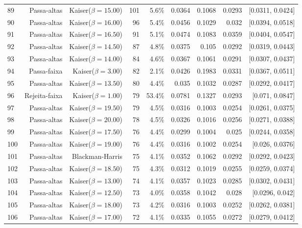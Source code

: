\begin{longtable}{lrrrrrrrr}
    89 & Passa-altas & Kaiser($\beta=15.00$) & 101 & 5.6\% & 0.0364 & 0.1068 & 0.0293 & [0.0311, 0.0424] \\
    90 & Passa-altas & Kaiser($\beta=16.00$) & 96 & 5.4\% & 0.0456 & 0.1029 & 0.032 & [0.0394, 0.0518] \\
    91 & Passa-altas & Kaiser($\beta=16.50$) & 91 & 5.1\% & 0.0474 & 0.1083 & 0.0359 & [0.0404, 0.0547] \\
    92 & Passa-altas & Kaiser($\beta=14.50$) & 87 & 4.8\% & 0.0375 & 0.105 & 0.0292 & [0.0319, 0.0443] \\
    93 & Passa-altas & Kaiser($\beta=14.00$) & 84 & 4.6\% & 0.0367 & 0.1061 & 0.0291 & [0.0307, 0.0437] \\
    94 & Passa-faixa & Kaiser($\beta=3.00$) & 82 & 2.1\% & 0.0426 & 0.1983 & 0.0331 & [0.0367, 0.0511] \\
    95 & Passa-altas & Kaiser($\beta=13.50$) & 80 & 4.4\% & 0.035 & 0.1032 & 0.0287 & [0.0292, 0.0417] \\
    96 & Rejeita-faixa & Kaiser($\beta=1.00$) & 79 & 53.4\% & 0.0781 & 0.1327 & 0.0293 & [0.071, 0.0847] \\
    97 & Passa-altas & Kaiser($\beta=19.50$) & 79 & 4.5\% & 0.0316 & 0.1003 & 0.0254 & [0.0261, 0.0375] \\
    98 & Passa-altas & Kaiser($\beta=20.00$) & 78 & 4.5\% & 0.0326 & 0.1016 & 0.0256 & [0.0271, 0.0388] \\
    99 & Passa-altas & Kaiser($\beta=17.50$) & 76 & 4.4\% & 0.0299 & 0.1004 & 0.025 & [0.0244, 0.0358] \\
    100 & Passa-altas & Kaiser($\beta=19.00$) & 76 & 4.4\% & 0.0316 & 0.1002 & 0.0254 & [0.026, 0.0376] \\
    101 & Passa-altas & Blackman-Harris & 75 & 4.1\% & 0.0352 & 0.1062 & 0.0292 & [0.0292, 0.0423] \\
    102 & Passa-altas & Kaiser($\beta=18.50$) & 75 & 4.3\% & 0.0312 & 0.1019 & 0.0255 & [0.0259, 0.0374] \\
    103 & Passa-altas & Kaiser($\beta=13.00$) & 74 & 4.1\% & 0.0357 & 0.1023 & 0.0285 & [0.0302, 0.0431] \\
    104 & Passa-altas & Kaiser($\beta=12.50$) & 73 & 4.0\% & 0.0358 & 0.1042 & 0.028 & [0.0296, 0.042] \\
    105 & Passa-altas & Kaiser($\beta=18.00$) & 73 & 4.2\% & 0.0316 & 0.1003 & 0.0252 & [0.0262, 0.0381] \\
    106 & Passa-altas & Kaiser($\beta=17.00$) & 72 & 4.1\% & 0.0335 & 0.1055 & 0.0272 & [0.0279, 0.0412] \\

\end{longtable}
